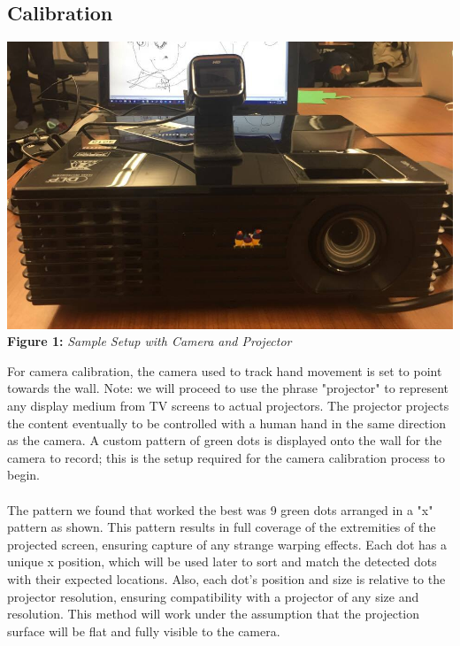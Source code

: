 \documentclass[twoside,twocolumn]{article}
\begin{document}
\subsection{Calibration}

\begin{center}
	\includegraphics[scale=0.19]{setup} \\
	\vspace{0.25cm}
	\small{\textbf{Figure 1:} \textit{Sample Setup with Camera and Projector}}
\end{center}

For camera calibration, the camera used to track hand movement is set to point towards the wall. Note: we will proceed to use the phrase "projector" to represent any display medium from TV screens to actual projectors. The projector projects the content eventually to be controlled with a human hand in the same direction as the camera. A custom pattern of green dots is displayed onto the wall for the camera to record; this is the setup required for the camera calibration process to begin. \\ \\
The pattern we found that worked the best was 9 green dots arranged in a "x" pattern as shown. This pattern results in full coverage of the extremities of the projected screen, ensuring capture of any strange warping effects. Each dot has a unique x position, which will be used later to sort and match the detected dots with their expected locations. Also, each dot's position and size is relative to the projector resolution, ensuring compatibility with a projector of any size and resolution. This method will work under the assumption that the projection surface will be flat and fully visible to the camera.
\end{document}
